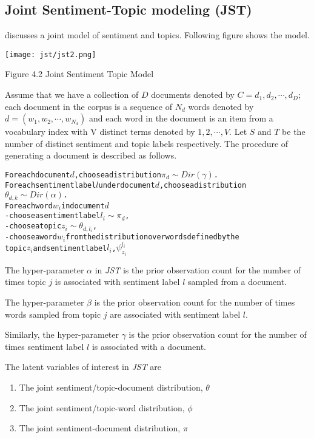 \subsection{Joint Sentiment-Topic modeling (JST)}

\citep*{lin2009joint} discusses a joint model of sentiment and topics. Following figure shows the model.

\texttt{[image: jst/jst2.png]} 
\begin{center}
 Figure 4.2 Joint Sentiment Topic Model
\end{center}

Assume that we have a collection of \(D\) documents denoted by \(C = {d_1,d_2,\cdots,d_D} \); each document in the corpus is a sequence of \(N_d\) words denoted by 
\(d = (w_1,w_2,\cdots,w_{N_d}) \) and each word in the document is an item from a vocabulary index with V distinct terms denoted by \({1,2,\cdots,V}\). Let \(S\) and 
\(T\) be the number of distinct sentiment and topic labels respectively. The procedure of generating a document is described as follows.

\begin{alltt}
For each document \(d\), choose a distribution \(\pi_d \sim Dir(\gamma)\).
For each sentiment label \(l\) under document \(d\), choose a distribution
\(\theta_{d,k} \sim Dir(\alpha)\).
For each word \(w_i\) in document \(d\)
  - choose a sentiment label \(l_i \sim \pi_d\),
  - choose a topic \(z_i \sim \theta_{d,l_i}\),
  - choose a word \(w_i\) from the distribution over words defined by the 
    topic \(z_i\) and sentiment label \(l_i\), \(\psi_{z_i}^{l_i}\)
\end{alltt}

The hyper-parameter \(\alpha\) in \textit{JST} is the prior observation count for the number of times topic \(j\) is associated with  sentiment label \(l\) sampled from
a document. 

The hyper-parameter \(\beta\) is the prior observation count for the number of times words sampled from topic \(j\) are associated with sentiment label \(l\).

Similarly, the hyper-parameter \(\gamma\) is the prior observation count for the number of times sentiment label \(l\) is associated with a document.

The latent variables of interest in \textit{JST} are
\begin{enumerate}
 \item The joint sentiment/topic-document distribution, \(\theta\)
 \item The joint sentiment/topic-word distribution, \(\phi\)
 \item The joint sentiment-document distribution, \(\pi\)
\end{enumerate}

